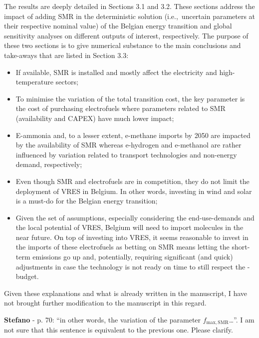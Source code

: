 \documentclass[12pt,a4paper]{article}
\def\ie{i.e.,\ }
\begin{document}
\noindent The results are deeply detailed in Sections 3.1 and 3.2. These sections address the impact of adding SMR in the deterministic solution (\ie uncertain parameters at their respective nominal value) of the Belgian energy transition and global sensitivity analyses on different outputs of interest, respectively.  The purpose of these two sections is to give numerical substance to the main conclusions and take-aways that are listed in Section 3.3:
\begin{itemize}
\item If available, SMR is installed and mostly affect the electricity and high-temperature sectors;
\item To minimise the variation of the total transition cost, the key parameter is the cost of purchasing electrofuels where parameters related to SMR (availability and CAPEX) have much lower impact;
\item E-ammonia and, to a lesser extent, e-methane imports by 2050 are impacted by the availability of SMR whereas e-hydrogen and e-methanol are rather influenced by variation related to transport technologies and non-energy demand, respectively;
\item Even though SMR and electrofuels are in competition, they do not limit the deployment of VRES in Belgium. In other words, investing in wind and solar is a must-do for the Belgian energy transition;
\item Given the set of assumptions, especially considering the end-use-demands and the local potential of VRES, Belgium will need to import molecules in the near future. On top of investing into VRES, it seems reasonable to invest in the imports of these electrofuels as betting on SMR means letting the short-term emissions go up and, potentially, requiring significant (and quick) adjustments in case the technology is not ready on time to still respect the -budget.
\end{itemize}

Given these explanations and what is already written in the manuscript, I have not brought further modification to the manuscript in this regard.

\begin{mdframed}[style=comment] %
{\color{orange} \textbf{Stefano}} - p. 70: ``in other words, the variation of the parameter $f_{\mathrm{max,SMR}}$…''. I am not sure that this sentence is equivalent to the previous one. Please clarify.
\end{mdframed}
\end{document}
